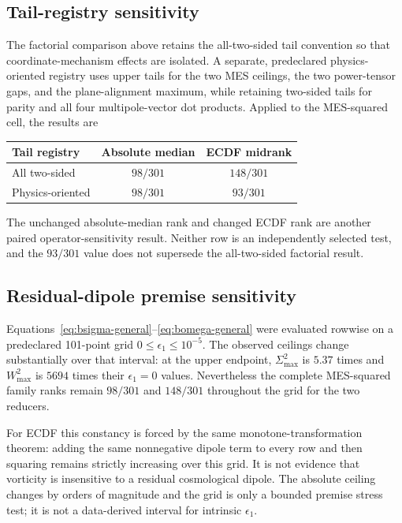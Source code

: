 \documentclass[11pt,a4paper]{article}
\begin{document}
\subsection{Tail-registry sensitivity}

The factorial comparison above retains the all-two-sided tail convention so
that coordinate-mechanism effects are isolated.  A separate, predeclared
physics-oriented registry uses upper tails for the two MES ceilings, the two
power-tensor gaps, and the plane-alignment maximum, while retaining two-sided
tails for parity and all four multipole-vector dot products.  Applied to the
MES-squared cell, the results are
\begin{center}
\small
\begin{tabular}{@{}lcc@{}}
\toprule
Tail registry & Absolute median & ECDF midrank\\
\midrule
All two-sided & $98/301$ & $148/301$\\
Physics-oriented & $98/301$ & $93/301$\\
\bottomrule
\end{tabular}
\end{center}
The unchanged absolute-median rank and changed ECDF rank are another paired
operator-sensitivity result.  Neither row is an independently selected test,
and the $93/301$ value does not supersede the all-two-sided factorial result.

\subsection{Residual-dipole premise sensitivity}

Equations~\eqref{eq:bsigma-general}--\eqref{eq:bomega-general} were evaluated
rowwise on a predeclared 101-point grid
$0\le\epsilon_1\le10^{-5}$.  The observed ceilings change substantially over
that interval: at the upper endpoint, $\Sigma^2_{\max}$ is $5.37$ times and
$W^2_{\max}$ is $5694$ times their $\epsilon_1=0$ values.  Nevertheless the
complete MES-squared family ranks remain $98/301$ and $148/301$ throughout the
grid for the two reducers.

For ECDF this constancy is forced by the same monotone-transformation theorem:
adding the same nonnegative dipole term to every row and then squaring remains
strictly increasing over this grid.  It is not evidence that vorticity is
insensitive to a residual cosmological dipole.  The absolute ceiling changes
by orders of magnitude and the grid is only a bounded premise stress test; it
is not a data-derived interval for intrinsic $\epsilon_1$.
\end{document}
